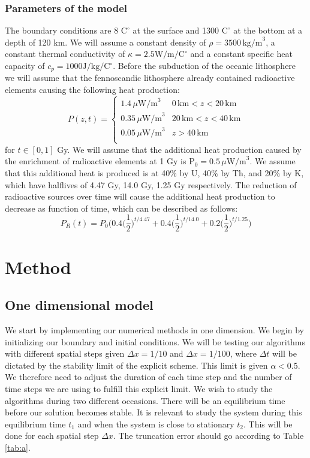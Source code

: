 \documentclass{article}
\begin{document}
\begin{multicols}{2}
\subsubsection{Parameters of the model}
The boundary conditions are 8 $\text{C}^{\circ}$ at the surface and 1300 $\text{C}^{\circ}$ at the bottom at a depth of 120 km. We will assume a constant density of $\rho=3500 \, \text{kg/m}^3$, a constant thermal conductivity of $\kappa=2.5 \text{W/m/} \text{C}^{\circ}$ and a constant specific heat capacity of $c_p=1000 \text{J/kg/}\text{C}^{\circ}$. Before the subduction of the oceanic lithosphere we will assume that the fennoscandic lithosphere already contained radioactive elements causing the following heat production:
\[
P(z, t) =
\begin{cases}
1.4 \, \mu \text{W/m}^3 &  0 \, \text{km} < z < 20 \, \text{km} \\
0.35 \, \mu \text{W/m}^3 &  20 \, \text{km} < z < 40 \, \text{km} \\
0.05 \, \mu \text{W/m}^3 &  z > 40 \, \text{km} \\
\end{cases}
\]
for $t\in [0, 1]$ Gy. We will assume that the additional heat production caused by the enrichment of radioactive elements at 1 Gy is $\text{P}_0=0.5 \, \mu \text{W/m}^3$. We assume that this additional heat is produced is at 40$\%$ by U, 40$\%$ by Th, and 20$\%$ by K, which have halflives of 4.47 Gy, 14.0 Gy, 1.25 Gy respectively. The reduction of radioactive sources over time will cause the additional heat production to decrease as function of time, which can be described as follows:
\begin{equation}
	P_R(t) = P_0\Bigg(0.4\bigg(\frac{1}{2}\bigg)^{t/4.47}+0.4\bigg(\frac{1}{2}\bigg)^{t/14.0}+0.2\bigg(\frac{1}{2}\bigg)^{t/1.25}\Bigg)
\end{equation}


\section{Method}

\subsection{One dimensional model}

We start by implementing our numerical methods in one dimension. We begin by initializing our boundary and initial conditions. We will be testing our algorithms with different spatial steps given $\Delta x =1/10$ and $\Delta x = 1/100$, where $\Delta t$ will be dictated by the stability limit of the explicit scheme. This limit is given $\alpha<0.5$. We therefore need to adjust the duration of each time step and the number of time steps we are using to fulfill this explicit limit. We wish to study the algorithms during two different occasions. There will be an equilibrium time before our solution becomes stable. It is relevant to study the system during this equilibrium time $t_1$ and when the system is close to stationary $t_2$. This will be done for each spatial step $\Delta x$. The truncation error should go according to Table \ref{tab:a}.


\end{multicols}
\end{document}
